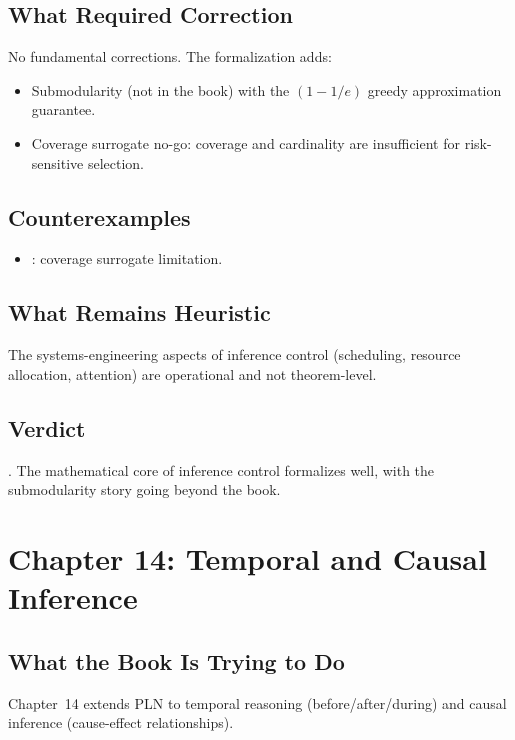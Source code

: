 \documentclass[11pt,openany]{report}
\begin{document}
\section{What Required Correction}

No fundamental corrections.  The formalization adds:
\begin{itemize}
\item Submodularity (not in the book) with the $(1-1/e)$ greedy
  approximation guarantee.
\item Coverage surrogate no-go: coverage and cardinality are insufficient
  for risk-sensitive selection.
\end{itemize}

\section{Counterexamples}

\begin{itemize}
\item {}: coverage
  surrogate limitation.
\end{itemize}

\section{What Remains Heuristic}

The systems-engineering aspects of inference control (scheduling,
resource allocation, attention) are operational and not theorem-level.

\section{Verdict}

\verdictClean{}.  The mathematical core of inference control formalizes
well, with the submodularity story going beyond the book.


\chapter{Chapter 14: Temporal and Causal Inference}
\label{ch:review-ch14}

\section{What the Book Is Trying to Do}

Chapter~14 extends PLN to temporal reasoning (before/after/during) and
causal inference (cause-effect relationships).
\end{document}
